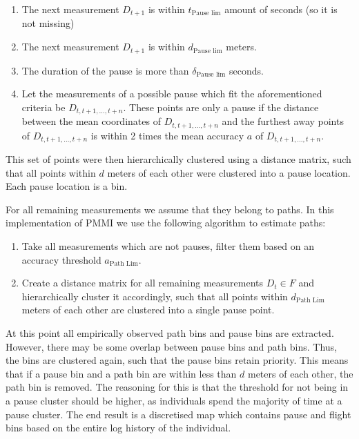 \documentclass[man]{apa6}
\providecommand{\tightlist}{%
  \setlength{\itemsep}{0pt}\setlength{\parskip}{0pt}}
\theoremstyle{definition}
\theoremstyle{definition}
\theoremstyle{definition}
\theoremstyle{remark}
\begin{document}
\begin{enumerate}
\def\labelenumi{\arabic{enumi}.}
\tightlist
\item
  The next measurement \(D_{t+1}\) is within \(t_{\text{Pause lim}}\)
  amount of seconds (so it is not missing)
\item
  The next measurement \(D_{t+1}\) is within \(d_{\text{Pause lim}}\)
  meters.
\item
  The duration of the pause is more than \(\delta_{\text{Pause lim}}\)
  seconds.
\item
  Let the measurements of a possible pause which fit the aforementioned
  criteria be \(D_{t,t+1,...,t+n}\). These points are only a pause if
  the distance between the mean coordinates of \(D_{t,t+1,...,t+n}\) and
  the furthest away points of \(D_{t,t+1,...,t+n}\) is within 2 times
  the mean accuracy \(a\) of \(D_{t,t+1,...,t+n}\).
\end{enumerate}

This set of points were then hierarchically clustered using a distance
matrix, such that all points within \(d\) meters of each other were
clustered into a pause location. Each pause location is a bin.

For all remaining measurements we assume that they belong to paths. In
this implementation of PMMI we use the following algorithm to estimate
paths:

\begin{enumerate}
\def\labelenumi{\arabic{enumi}.}
\tightlist
\item
  Take all measurements which are not pauses, filter them based on an
  accuracy threshold \(a_{\text{Path Lim}}\).
\item
  Create a distance matrix for all remaining measurements \(D_t \in F\)
  and hierarchically cluster it accordingly, such that all points within
  \(d_{\text{Path Lim}}\) meters of each other are clustered into a
  single pause point.
\end{enumerate}

At this point all empirically observed path bins and pause bins are
extracted. However, there may be some overlap between pause bins and
path bins. Thus, the bins are clustered again, such that the pause bins
retain priority. This means that if a pause bin and a path bin are
within less than \(d\) meters of each other, the path bin is removed.
The reasoning for this is that the threshold for not being in a pause
cluster should be higher, as individuals spend the majority of time at a
pause cluster. The end result is a discretised map which contains pause
and flight bins based on the entire log history of the individual.
\end{document}
